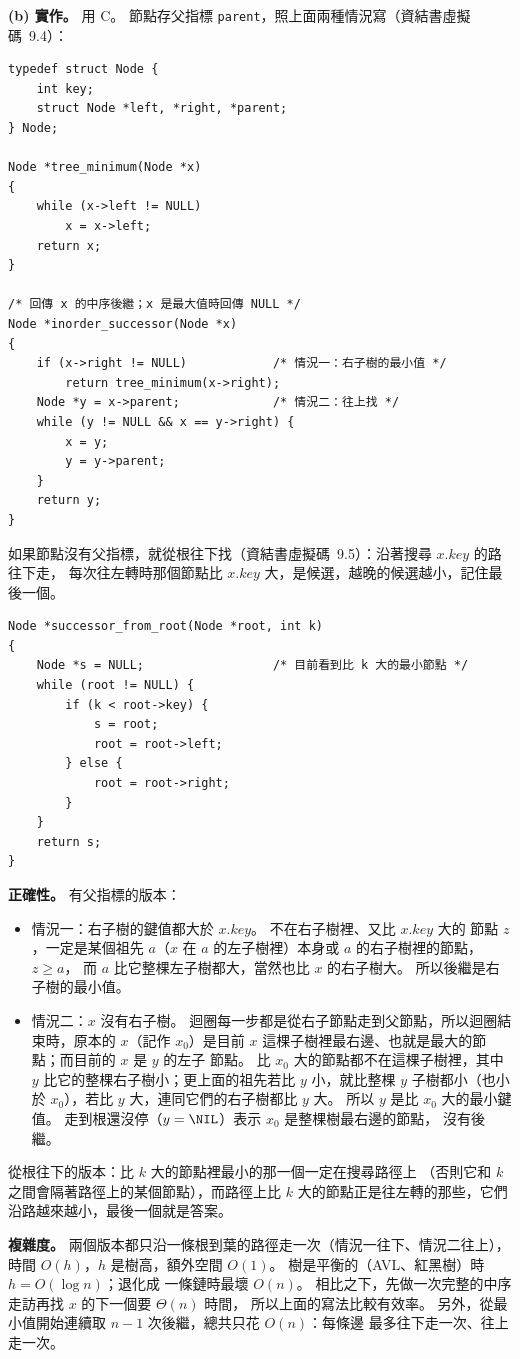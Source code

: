 \begin{pastsoln}
\textbf{(b) 實作。} 用 C。 節點存父指標 \texttt{parent}，照上面兩種情況寫（資結書虛擬碼~9.4）：

\begin{verbatim}
typedef struct Node {
    int key;
    struct Node *left, *right, *parent;
} Node;

Node *tree_minimum(Node *x)
{
    while (x->left != NULL)
        x = x->left;
    return x;
}

/* 回傳 x 的中序後繼；x 是最大值時回傳 NULL */
Node *inorder_successor(Node *x)
{
    if (x->right != NULL)            /* 情況一：右子樹的最小值 */
        return tree_minimum(x->right);
    Node *y = x->parent;             /* 情況二：往上找 */
    while (y != NULL && x == y->right) {
        x = y;
        y = y->parent;
    }
    return y;
}
\end{verbatim}

如果節點沒有父指標，就從根往下找（資結書虛擬碼~9.5）：沿著搜尋 $x.\mathit{key}$ 的路往下走，
每次往左轉時那個節點比 $x.\mathit{key}$ 大，是候選，越晚的候選越小，記住最後一個。

\begin{verbatim}
Node *successor_from_root(Node *root, int k)
{
    Node *s = NULL;                  /* 目前看到比 k 大的最小節點 */
    while (root != NULL) {
        if (k < root->key) {
            s = root;
            root = root->left;
        } else {
            root = root->right;
        }
    }
    return s;
}
\end{verbatim}

\textbf{正確性。} 有父指標的版本：
\begin{itemize}
\item 情況一：右子樹的鍵值都大於 $x.\mathit{key}$。 不在右子樹裡、又比 $x.\mathit{key}$ 大的
節點 $z$，一定是某個祖先 $a$（$x$ 在 $a$ 的左子樹裡）本身或 $a$ 的右子樹裡的節點，$z \ge a$，
而 $a$ 比它整棵左子樹都大，當然也比 $x$ 的右子樹大。 所以後繼是右子樹的最小值。
\item 情況二：$x$ 沒有右子樹。 迴圈每一步都是從右子節點走到父節點，所以迴圈結束時，原本的
$x$（記作 $x_0$）是目前 $x$ 這棵子樹裡最右邊、也就是最大的節點；而目前的 $x$ 是 $y$ 的左子
節點。 比 $x_0$ 大的節點都不在這棵子樹裡，其中 $y$ 比它的整棵右子樹小；更上面的祖先若比 $y$
小，就比整棵 $y$ 子樹都小（也小於 $x_0$），若比 $y$ 大，連同它們的右子樹都比 $y$ 大。 所以
$y$ 是比 $x_0$ 大的最小鍵值。 走到根還沒停（$y = \NIL$）表示 $x_0$ 是整棵樹最右邊的節點，
沒有後繼。
\end{itemize}
從根往下的版本：比 $k$ 大的節點裡最小的那一個一定在搜尋路徑上
（否則它和 $k$ 之間會隔著路徑上的某個節點），而路徑上比 $k$ 大的節點正是往左轉的那些，它們
沿路越來越小，最後一個就是答案。

\textbf{複雜度。} 兩個版本都只沿一條根到葉的路徑走一次（情況一往下、情況二往上），時間
$O(h)$，$h$ 是樹高，額外空間 $O(1)$。 樹是平衡的（AVL、紅黑樹）時 $h = O(\log n)$；退化成
一條鏈時最壞 $O(n)$。 相比之下，先做一次完整的中序走訪再找 $x$ 的下一個要 $\Theta(n)$ 時間，
所以上面的寫法比較有效率。 另外，從最小值開始連續取 $n - 1$ 次後繼，總共只花 $O(n)$：每條邊
最多往下走一次、往上走一次。
\end{pastsoln}

